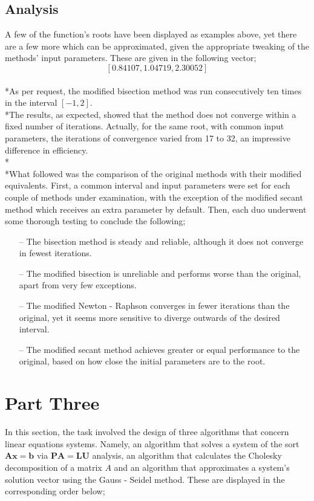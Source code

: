 \documentclass{article}
\begin{document}
\subsection{Analysis}
A few of the function's roots have been displayed as examples above, yet there are a few more which can be approximated, given the appropriate tweaking of the methods' input parameters. These are given in the following vector;\[[0.84107, 1.04719, 2.30052]\]
\\*As per request, the modified bisection method was run consecutively ten times in the interval $[-1,2]$.
\\*The results, as expected, showed that the method does not converge within a fixed number of iterations. Actually, for the same root, with common input parameters, the iterations of convergence varied from 17 to 32, an impressive difference in efficiency.
\\*\\*What followed was the comparison of the original methods with their modified equivalents. First, a common interval and input parameters were set for each couple of methods under examination, with the exception of the modified secant method which receives an extra parameter by default. Then, each duo underwent some thorough testing to conclude the following;
\begin{itemize}
    \item[--]The bisection method is steady and reliable, although it does not converge in fewest iterations. 
    \item[--]The modified bisection is unreliable and  performs worse than the original, apart from very few exceptions.
    \item[--]The modified Newton - Raphson converges in fewer iterations than the original, yet it seems more sensitive to diverge outwards of the desired interval.
    \item[--]The modified secant method achieves greater or equal performance to the original, based on how close the initial parameters are to the root.
\end{itemize}
\pagebreak
\section{Part Three}
In this section, the task involved the design of three algorithms that concern linear equations systems. Namely, an algorithm that solves a system of the sort $\mathbf{Ax = b}$ via $\mathbf{PA = LU}$ analysis, an algorithm that calculates the Cholesky decomposition of a matrix $A$ and an algorithm that approximates a system's solution vector using the Gauss - Seidel method. These are displayed in the corresponding order below;
\end{document}
